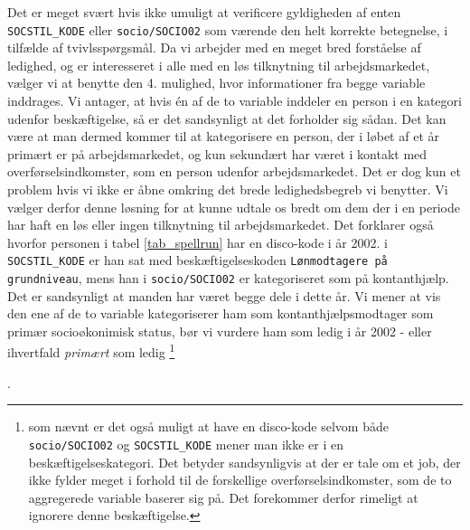 %
Det er meget svært hvis ikke umuligt at verificere gyldigheden af enten \texttt{SOCSTIL\_KODE} eller \texttt{socio/SOCIO02} som værende den helt korrekte betegnelse, i tilfælde af tvivlsspørgsmål. Da vi arbejder med en meget bred forståelse af ledighed, og er interesseret i alle med en løs tilknytning til arbejdsmarkedet, vælger vi at benytte den 4. mulighed, hvor informationer fra begge variable inddrages. Vi antager, at hvis én af de to variable inddeler en person i en kategori udenfor beskæftigelse, så er det sandsynligt at det forholder sig sådan. Det kan være at man dermed kommer til at kategorisere en person, der i løbet af et år primært er på arbejdsmarkedet, og kun sekundært har været i kontakt med overførselsindkomster, som en person udenfor arbejdsmarkedet. Det er dog kun et problem hvis vi ikke er åbne omkring det brede ledighedsbegreb vi benytter.  
Vi vælger derfor denne løsning for at kunne udtale os bredt om dem der i en periode har haft en løs eller ingen tilknytning til arbejdsmarkedet. Det forklarer også hvorfor personen i tabel \ref{tab_spellrun} har en disco-kode i år 2002. i \texttt{SOCSTIL\_KODE} er han sat med beskæftigelseskoden \texttt{Lønmodtagere på grundniveau}, mens han i \texttt{socio/SOCIO02} er kategoriseret som på kontanthjælp. Det er sandsynligt at manden har været begge dele i dette år. Vi mener at vis den ene af de to variable kategoriserer ham som kontanthjælpsmodtager som primær socioøkonimisk status, bør vi vurdere ham som ledig i år 2002 - eller ihvertfald \emph{primært} som ledig%
%
\footnote{som nævnt er det også muligt at have en disco-kode selvom både \texttt{socio/SOCIO02} og \texttt{SOCSTIL\_KODE} mener man ikke er i en beskæftigelseskategori. Det betyder sandsynligvis at der er tale om et job, der ikke fylder meget i forhold til de forskellige overførselsindkomster, som de to aggregerede variable baserer sig på. Det forekommer derfor rimeligt at ignorere denne beskæftigelse.}
%

\parencite[158]{Bourdieu1986}. 

\parencite[185]{DST2014}











